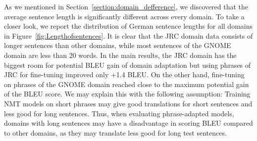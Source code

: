 As we mentioned in Section~\ref{section:domain_defference}, we discovered that the average sentence length is significantly different across every domain. To take a closer look, we report the distribution of German sentence lengths for all domains in Figure~\ref{fig:Lengthofsentences}. %
It is clear that the JRC domain data consists of longer sentences than other domains, while most sentences of the GNOME domain are less than 20 words. In the main results, the JRC domain has the biggest room for potential BLEU gain of domain adaptation but using phrases of JRC for fine-tuning improved only +1.4 BLEU. 
On the other hand, fine-tuning on phrases of the GNOME domain reached close to the maximum potential gain of the BLEU score. 
We may explain this with the following assumption: Training NMT models on short phrases may give good translations for short sentences and less good for long sentences. Thus, when evaluating phrase-adapted models, domains with long sentences may have a disadvantage in scoring BLEU compared to other domains, as they may translate less good for long test sentences.  


